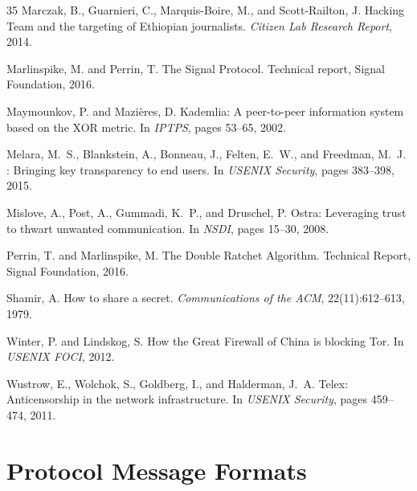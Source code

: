 \documentclass[11pt,a4paper]{article}
\begin{document}
\begin{thebibliography}{35}
Marczak, B., Guarnieri, C., Marquis-Boire, M., and Scott-Railton, J.
\newblock Hacking {Team} and the targeting of {Ethiopian} journalists.
\newblock \emph{Citizen Lab Research Report}, 2014.

Marlinspike, M. and Perrin, T.
\newblock The {Signal} Protocol.
\newblock Technical report, Signal Foundation, 2016.

Maymounkov, P. and Mazi\`{e}res, D.
\newblock Kademlia: A peer-to-peer information system based on the {XOR} metric.
\newblock In \emph{IPTPS}, pages 53--65, 2002.

Melara, M.~S., Blankstein, A., Bonneau, J., Felten, E.~W., and Freedman, M.~J.
: Bringing key transparency to end users.
\newblock In \emph{USENIX Security}, pages 383--398, 2015.

Mislove, A., Post, A., Gummadi, K.~P., and Druschel, P.
\newblock Ostra: Leveraging trust to thwart unwanted communication.
\newblock In \emph{NSDI}, pages 15--30, 2008.

Perrin, T. and Marlinspike, M.
\newblock The Double Ratchet Algorithm.
\newblock Technical Report, Signal Foundation, 2016.

Shamir, A.
\newblock How to share a secret.
\newblock \emph{Communications of the ACM}, 22(11):612--613, 1979.

Winter, P. and Lindskog, S.
\newblock How the {Great Firewall of China} is blocking {Tor}.
\newblock In \emph{USENIX FOCI}, 2012.

Wustrow, E., Wolchok, S., Goldberg, I., and Halderman, J.~A.
\newblock Telex: Anticensorship in the network infrastructure.
\newblock In \emph{USENIX Security}, pages 459--474, 2011.

\end{thebibliography}

\appendix

\section{Protocol Message Formats}
\end{document}
